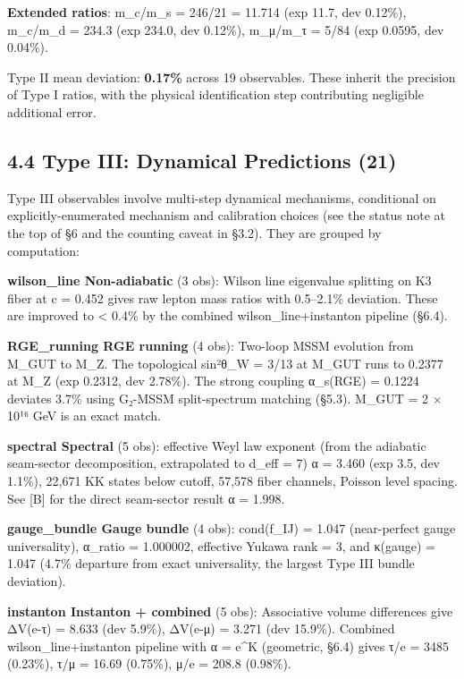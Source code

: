 \documentclass[11pt,a4paper]{article}
\begin{document}
\textbf{Extended ratios}: m\_\allowbreak{}c/m\_\allowbreak{}s = 246/21 = 11.714 (exp 11.7, dev 0.12\%), m\_\allowbreak{}c/m\_\allowbreak{}d = 234.3 (exp 234.0, dev 0.12\%), m\_\allowbreak{}μ/m\_\allowbreak{}τ = 5/84 (exp 0.0595, dev 0.04\%).

Type II mean deviation: \textbf{0.17\%} across 19 observables. These inherit the precision of Type I ratios, with the physical identification step contributing negligible additional error.

\subsection{4.4 Type III: Dynamical Predictions (21)}\label{type-iii-dynamical-predictions-21}

Type III observables involve multi-step dynamical mechanisms, conditional on explicitly-enumerated mechanism and calibration choices (see the status note at the top of §6 and the counting caveat in §3.2). They are grouped by computation:

\textbf{wilson\_\allowbreak{}line Non-adiabatic} (3 obs): Wilson line eigenvalue splitting on K3 fiber at c = 0.452 gives raw lepton mass ratios with 0.5--2.1\% deviation. These are improved to \textless{} 0.4\% by the combined wilson\_\allowbreak{}line+instanton pipeline (§6.4).

\textbf{RGE\_\allowbreak{}running RGE running} (4 obs): Two-loop MSSM evolution from M\_\allowbreak{}GUT to M\_\allowbreak{}Z. The topological sin²θ\_\allowbreak{}W = 3/13 at M\_\allowbreak{}GUT runs to 0.2377 at M\_\allowbreak{}Z (exp 0.2312, dev 2.78\%). The strong coupling α\_\allowbreak{}s(RGE) = 0.1224 deviates 3.7\% using G₂-MSSM split-spectrum matching (§5.3). M\_\allowbreak{}GUT = 2 × 10¹⁶ GeV is an exact match.

\textbf{spectral Spectral} (5 obs): effective Weyl law exponent (from the adiabatic seam-sector decomposition, extrapolated to d\_\allowbreak{}eff = 7) α = 3.460 (exp 3.5, dev 1.1\%), 22,671 KK states below cutoff, 57,578 fiber channels, Poisson level spacing. See {[}B{]} for the direct seam-sector result α = 1.998.

\textbf{gauge\_\allowbreak{}bundle Gauge bundle} (4 obs): cond(f\_\allowbreak{}IJ) = 1.047 (near-perfect gauge universality), α\_\allowbreak{}ratio = 1.000002, effective Yukawa rank = 3, and κ(gauge) = 1.047 (4.7\% departure from exact universality, the largest Type III bundle deviation).

\textbf{instanton Instanton + combined} (5 obs): Associative volume differences give ΔV(e-τ) = 8.633 (dev 5.9\%), ΔV(e-μ) = 3.271 (dev 15.9\%). Combined wilson\_\allowbreak{}line+instanton pipeline with α = e\^{}K (geometric, §6.4) gives τ/e = 3485 (0.23\%), τ/μ = 16.69 (0.75\%), μ/e = 208.8 (0.98\%).
\end{document}

